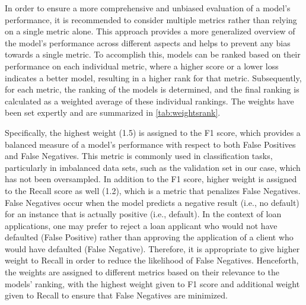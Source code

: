 In order to ensure a more comprehensive and unbiased evaluation of a model's performance, it is recommended to consider multiple metrics rather than relying on a single metric alone. This approach provides a more generalized overview of the model's performance across different aspects and helps to prevent any bias towards a single metric.
To accomplish this, models can be ranked based on their performance on each individual metric, where a higher score or a lower loss indicates a better model, resulting in a higher rank for that metric. Subsequently, for each metric, the ranking of the models is determined, and the final ranking is calculated as a weighted average of these individual rankings.
The weights have been set expertly and are summarized in \autoref{tab:weightsrank}.

Specifically, the highest weight (1.5) is assigned to the F1 score, which provides a balanced measure of a model's performance with respect to both False Positives and False Negatives.
This metric is commonly used in classification tasks, particularly in imbalanced data sets, such as the validation set in our case, which has not been oversampled.
In addition to the F1 score, higher weight is assigned to the Recall score as well (1.2), which is a metric that penalizes False Negatives.
False Negatives occur when the model predicts a negative result (i.e., no default) for an instance that is actually positive (i.e., default).
In the context of loan applications, one may prefer to reject a loan applicant who would not have defaulted (False Positive) rather than approving the application of a client who would have defaulted (False Negative). Therefore, it is appropriate to give higher weight to Recall in order to reduce the likelihood of False Negatives.
Henceforth, the weights are assigned to different metrics based on their relevance to the models' ranking, with the highest weight given to F1 score and additional weight given to Recall to ensure that False Negatives are minimized.

